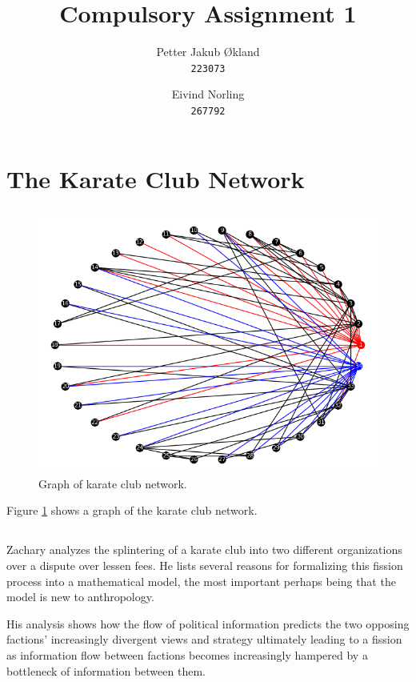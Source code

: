 \documentclass[11pt]{article}
\title{ Compulsory Assignment 1}
\author{
  Petter Jakub Økland\\
  \texttt{223073}
  \and
  Eivind Norling\\
  \texttt{267792}
}
\begin{document}
\maketitle

\section{The Karate Club Network}
\subsection{}
\begin{figure}
  \includegraphics[width=\linewidth]{Figure_1.png}
  \caption{Graph of karate club network.}
  \label{fig:graph model}
\end{figure}

Figure \ref{fig:graph model} shows a graph of the karate club network.

\subsection{}
Zachary\cite{Zachary} analyzes the splintering of a karate club into two different organizations
over a dispute over lessen fees. He lists several reasons for formalizing this fission
process into a mathematical model, the most important perhaps being that the model is
new to anthropology.

His analysis shows how the flow of political information predicts the two opposing
factions' increasingly divergent views and strategy ultimately leading to a fission
as information flow between factions becomes increasingly hampered by a bottleneck
of information between them.
\end{document}
